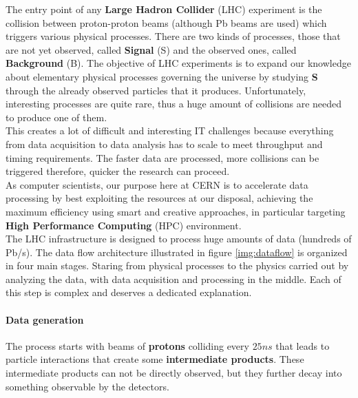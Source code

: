 The entry point of any \textbf{Large Hadron Collider} (LHC) experiment is the collision between proton-proton beams (although Pb beams are used) which triggers various physical processes. There are two kinds of processes, those that are not yet observed, called \textbf{Signal} (S) and the observed ones, called \textbf{Background} (B). The objective of LHC experiments is to expand our knowledge about elementary physical processes governing the universe by studying \textbf{S} through the already observed particles that it produces. Unfortunately, interesting processes are quite rare, thus a huge amount of collisions are needed to produce one of them.\\
This creates a lot of difficult and interesting IT challenges because everything from data acquisition to data analysis has to scale to meet throughput and timing requirements. The faster data are processed, more collisions can be triggered therefore, quicker the research can proceed.\\
As computer scientists, our purpose here at CERN is to accelerate data processing by best exploiting the resources at our disposal, achieving the maximum efficiency using smart and creative approaches, in particular targeting \textbf{High Performance Computing} (HPC) environment. \\
The LHC infrastructure is designed to process huge amounts of data (hundreds of Pb/s). The data flow architecture illustrated in figure \ref{img:dataflow} is organized in four main stages. Staring from physical processes to the physics carried out by analyzing the data, with data acquisition and processing in the middle. Each of this step is complex and deserves a dedicated explanation. 
\paragraph{Data generation}
The process starts with beams of \textbf{protons} colliding every $25ns$ that leads to particle interactions that create some \textbf{intermediate products}. These intermediate products can not be directly observed, but they further decay into something observable by the detectors.
